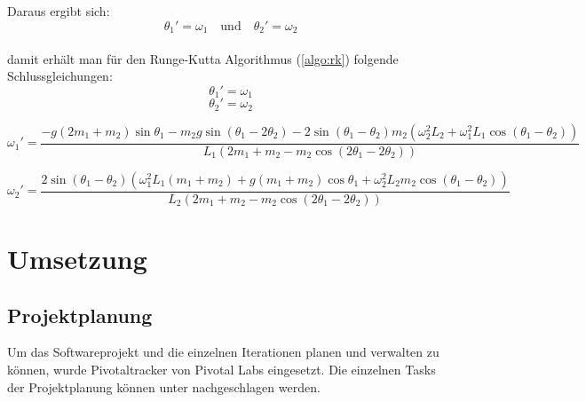 \documentclass[12pt]{article}
\numberwithin{equation}{subsection}
\begin{document}
Daraus ergibt sich:
\begin{equation*}
	\theta_1' = \omega_1 \quad \text{und} \quad \theta_2' = \omega_2
\end{equation*}
\
\\
damit erhält man für den Runge-Kutta Algorithmus (\ref{algo:rk}) folgende Schlussgleichungen:
\begin{equation} \label{eq:rk:1}
	\theta_1' = \omega_1
\end{equation}
\begin{equation} \label{eq:rk:2}
	\theta_2' = \omega_2
\end{equation}

\begin{equation} \label{eq:rk:3}
	\omega_1' = \frac{-g(2m_1+m_2)\sin\theta_1 - m_2 g \sin(\theta_1 - 2\theta_2) -2\sin(\theta_1 - \theta_2)m_2(\omega_2^2 L_2 + \omega_1^2 L_1\cos(\theta_1 - \theta_2))}
	{L_1(2m_1 + m_2 - m_2 \cos(2\theta_1 - 2\theta_2))}
\end{equation}

\begin{equation} \label{eq:rk:4}
	\omega_2' = \frac{2\sin(\theta_1 - \theta_2)(\omega_1^2 L_1(m_1 + m_2) + g(m_1 + m_2)\cos\theta_1 + \omega_2^2 L_2 m_2 \cos(\theta_1 - \theta_2))}
	{L_2 (2m_1 + m_2 - m_2 \cos(2 \theta_1 - 2\theta_2))}
\end{equation}


\newpage
\section{Umsetzung}

\subsection{Projektplanung}
Um das Softwareprojekt und die einzelnen Iterationen planen und verwalten zu können, wurde Pivotaltracker \citep{pivotal} von Pivotal Labs eingesetzt. Die einzelnen Tasks der Projektplanung können unter \citep{hoehnHauenstein} nachgeschlagen werden.
\end{document}
